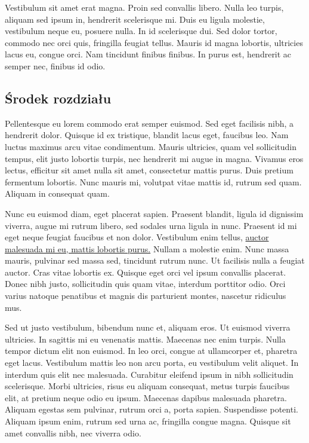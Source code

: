 \documentclass{article}
\begin{document}
Vestibulum sit amet erat magna. Proin sed convallis libero. Nulla leo turpis, aliquam sed ipsum in, hendrerit scelerisque mi. Duis eu 
ligula molestie, vestibulum neque eu, posuere nulla. In id scelerisque dui. Sed dolor tortor, commodo nec orci quis, fringilla feugiat 
tellus. Mauris id magna lobortis, ultricies lacus eu, congue orci. Nam tincidunt finibus finibus. In purus est, hendrerit ac semper nec, 
finibus id odio.

\subsection{Środek rozdziału}
Pellentesque eu lorem commodo erat semper euismod. Sed eget facilisis nibh, a hendrerit dolor. Quisque id ex tristique, blandit lacus 
eget, faucibus leo. Nam luctus maximus arcu vitae condimentum. Mauris ultricies, quam vel sollicitudin tempus, elit justo lobortis 
turpis, nec hendrerit mi augue in magna. Vivamus eros lectus, efficitur sit amet nulla sit amet, consectetur mattis purus. Duis pretium 
fermentum lobortis. Nunc mauris mi, volutpat vitae mattis id, rutrum sed quam. Aliquam in consequat quam.

Nunc eu euismod diam, eget placerat sapien. Praesent blandit, ligula id dignissim viverra, augue mi rutrum libero, sed sodales urna 
ligula in nunc. Praesent id mi eget neque feugiat faucibus et non dolor. Vestibulum enim tellus, \underline{auctor malesuada mi eu, 
mattis lobortis purus.} Nullam a molestie enim. Nunc massa mauris, pulvinar sed massa sed, tincidunt rutrum nunc. Ut facilisis nulla a 
feugiat auctor. Cras vitae lobortis ex. Quisque eget orci vel ipsum convallis placerat. Donec nibh justo, sollicitudin quis quam vitae, 
interdum porttitor odio. Orci varius natoque penatibus et magnis dis parturient montes, nascetur ridiculus mus.

Sed ut justo vestibulum, bibendum nunc et, aliquam eros. Ut euismod viverra ultricies. In sagittis mi eu venenatis mattis. Maecenas nec 
enim turpis. Nulla tempor dictum elit non euismod. In leo orci, congue at ullamcorper et, pharetra eget lacus. Vestibulum mattis leo non 
arcu porta, eu vestibulum velit aliquet. In interdum quis elit nec malesuada. Curabitur eleifend ipsum in nibh sollicitudin scelerisque. 
Morbi ultricies, risus eu aliquam consequat, metus turpis faucibus elit, at pretium neque odio eu ipsum. Maecenas dapibus malesuada 
pharetra. Aliquam egestas sem pulvinar, rutrum orci a, porta sapien. Suspendisse potenti. Aliquam ipsum enim, rutrum sed urna ac, 
fringilla congue magna. Quisque sit amet convallis nibh, nec viverra odio.
\end{document}
